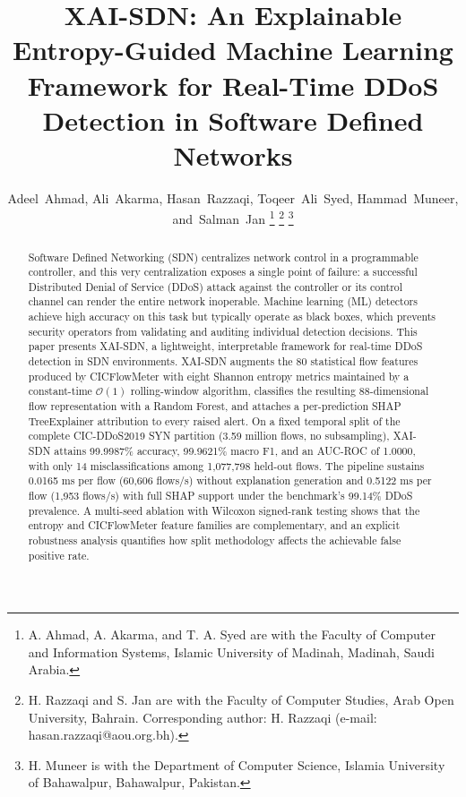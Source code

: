 ﻿\documentclass[journal]{IEEEtran}
\begin{document}
\title{XAI-SDN: An Explainable Entropy-Guided Machine Learning Framework for Real-Time DDoS Detection in Software Defined Networks}

\author{Adeel~Ahmad, Ali~Akarma, Hasan~Razzaqi, Toqeer~Ali~Syed, Hammad~Muneer, and~Salman~Jan%
\thanks{A. Ahmad, A. Akarma, and T. A. Syed are with the Faculty of Computer and Information Systems, Islamic University of Madinah, Madinah, Saudi Arabia.}%
\thanks{H. Razzaqi and S. Jan are with the Faculty of Computer Studies, Arab Open University, Bahrain. Corresponding author: H. Razzaqi (e-mail: hasan.razzaqi@aou.org.bh).}%
\thanks{H. Muneer is with the Department of Computer Science, Islamia University of Bahawalpur, Bahawalpur, Pakistan.}}

\maketitle

\begin{abstract}
Software Defined Networking (SDN) centralizes network control in a programmable controller, and this very centralization exposes a single point of failure: a successful Distributed Denial of Service (DDoS) attack against the controller or its control channel can render the entire network inoperable. Machine learning (ML) detectors achieve high accuracy on this task but typically operate as black boxes, which prevents security operators from validating and auditing individual detection decisions. This paper presents XAI-SDN, a lightweight, interpretable framework for real-time DDoS detection in SDN environments. XAI-SDN augments the 80 statistical flow features produced by CICFlowMeter with eight Shannon entropy metrics maintained by a constant-time $\mathcal{O}(1)$ rolling-window algorithm, classifies the resulting 88-dimensional flow representation with a Random Forest, and attaches a per-prediction SHAP TreeExplainer attribution to every raised alert. On a fixed temporal split of the complete CIC-DDoS2019 SYN partition (3.59 million flows, no subsampling), XAI-SDN attains 99.9987\% accuracy, 99.9621\% macro F1, and an AUC-ROC of 1.0000, with only 14 misclassifications among 1,077,798 held-out flows. The pipeline sustains 0.0165 ms per flow (60,606 flows/s) without explanation generation and 0.5122 ms per flow (1,953 flows/s) with full SHAP support under the benchmark's 99.14\% DDoS prevalence. A multi-seed ablation with Wilcoxon signed-rank testing shows that the entropy and CICFlowMeter feature families are complementary, and an explicit robustness analysis quantifies how split methodology affects the achievable false positive rate.
\end{abstract}
\end{document}
